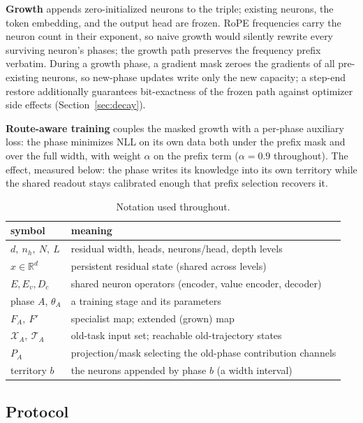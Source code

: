 \documentclass[11pt]{article}
\theoremstyle{definition}\newtheorem{definition}{Definition}
\theoremstyle{remark}\newtheorem{remark}{Remark}
\newcommand{\Xa}{\mathcal{X}_A}
\newcommand{\TA}{\mathcal{T}_A}
\begin{document}
\textbf{Growth} appends zero-initialized neurons to the triple; existing neurons, the token
embedding, and the output head are frozen. RoPE frequencies carry the neuron count in their
exponent, so naive growth would silently rewrite every surviving neuron's phases; the
growth path preserves the frequency prefix verbatim. During a growth phase, a gradient mask
zeroes the gradients of all pre-existing neurons, so new-phase updates write only the new
capacity; a step-end restore additionally guarantees bit-exactness of the frozen path against
optimizer side effects (Section~\ref{sec:decay}).

\textbf{Route-aware training} couples the masked growth with a per-phase auxiliary loss:
the phase minimizes NLL on its own data both under the prefix mask and over the full width,
with weight $\alpha$ on the prefix term ($\alpha=0.9$ throughout). The effect, measured
below: the phase writes its knowledge into its own territory while the shared readout stays
calibrated enough that prefix selection recovers it.

\begin{table}[t]
\centering\small
\caption{Notation used throughout.}
\label{tab:notation}
\begin{tabular}{ll}
\toprule
symbol & meaning \\
\midrule
$d,\ n_h,\ N,\ L$ & residual width, heads, neurons/head, depth levels \\
$x\in\mathbb{R}^{d}$ & persistent residual state (shared across levels) \\
$E,E_v,D_c$ & shared neuron operators (encoder, value encoder, decoder) \\
phase $A$, $\theta_A$ & a training stage and its parameters \\
$F_A,\ F'$ & specialist map; extended (grown) map \\
$\Xa,\ \TA$ & old-task input set; reachable old-trajectory states \\
$P_A$ & projection/mask selecting the old-phase contribution channels \\
territory $b$ & the neurons appended by phase $b$ (a width interval) \\
\bottomrule
\end{tabular}
\end{table}

\subsection{Protocol}
\label{sec:protocol}
\end{document}
